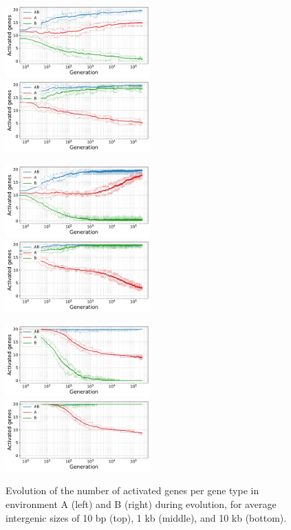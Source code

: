 \begin{figure}[H]
\centering
\includegraphics[width=0.495\textwidth]{param/mean-intergene/inter-0.01k/gene_activity_env_A.pdf}
\includegraphics[width=0.495\textwidth]{param/mean-intergene/inter-0.01k/gene_activity_env_B.pdf}

\includegraphics[width=0.495\textwidth]{param/mean-intergene/inter-1k/gene_activity_env_A.pdf}
\includegraphics[width=0.495\textwidth]{param/mean-intergene/inter-1k/gene_activity_env_B.pdf}

\includegraphics[width=0.495\textwidth]{param/mean-intergene/inter-10k/gene_activity_env_A.pdf}
\includegraphics[width=0.495\textwidth]{param/mean-intergene/inter-10k/gene_activity_env_B.pdf}
\caption[Evolution of the number of activated genes in each environment, with increasing mean intergenic distances]{Evolution of the number of activated genes per gene type in environment A (left) and B (right) during evolution, for average intergenic sizes of 10 bp (top), 1 kb (middle), and 10 kb (bottom).}
\label{fig:param:mean-intergene-activ-by-env}
\end{figure}

